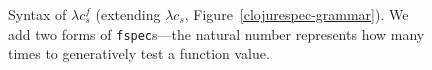 %
\begin{figure}
\caption{Syntax of $\lambda c_s^f$ (extending $\lambda c_s$, Figure~\ref{clojurespec-grammar}).
  We add two forms of \texttt{fspec}s---the natural number represents how
  many times to generatively test a function value.
  }
  \label{clojurespechof-grammar}
\end{figure}

